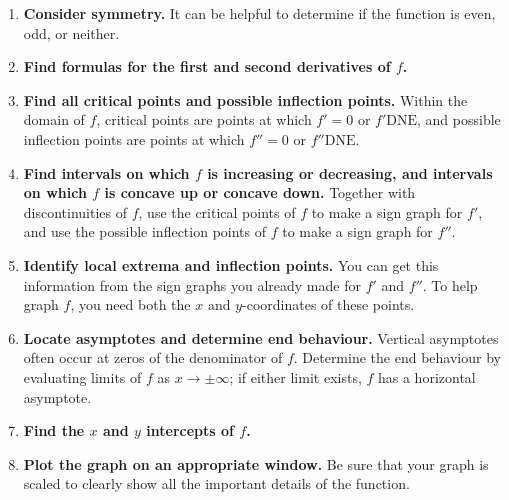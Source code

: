 \documentclass{article}
\begin{document}
\begin{itemize}
\begin{enumerate}
        \item \textbf{Consider symmetry.} It can be helpful to determine if the function is even, odd, or neither.
        \item \textbf{Find formulas for the first and second derivatives of $f$.}
        \item \textbf{Find all critical points and possible inflection points.} Within the domain of $f$, critical points are points at which $f' = 0$ or $f' \text{DNE}$, and possible inflection points are points at which $f'' = 0$ or $f'' \text{DNE}$.
        \item \textbf{Find intervals on which $f$ is increasing or decreasing, and intervals on which $f$ is concave up or concave down.} Together with discontinuities of $f$, use the critical points of $f$ to make a sign graph for $f'$, and use the possible inflection points of $f$ to make a sign graph for $f''$.
        \item \textbf{Identify local extrema and inflection points.} You can get this information from the sign graphs you already made for $f'$ and $f''$. To help graph $f$, you need both the $x$ and $y$-coordinates of these points.
        \item \textbf{Locate asymptotes and determine end behaviour.} Vertical asymptotes often occur at zeros of the denominator of $f$. Determine the end behaviour by evaluating limits of $f$ as $x \to \pm \infty$; if either limit exists, $f$ has a horizontal asymptote.
        \item \textbf{Find the $x$ and $y$ intercepts of $f$.}
        \item \textbf{Plot the graph on an appropriate window.} Be sure that your graph is scaled to clearly show all the important details of the function.
    \end{enumerate}
\end{itemize}
\end{document}
